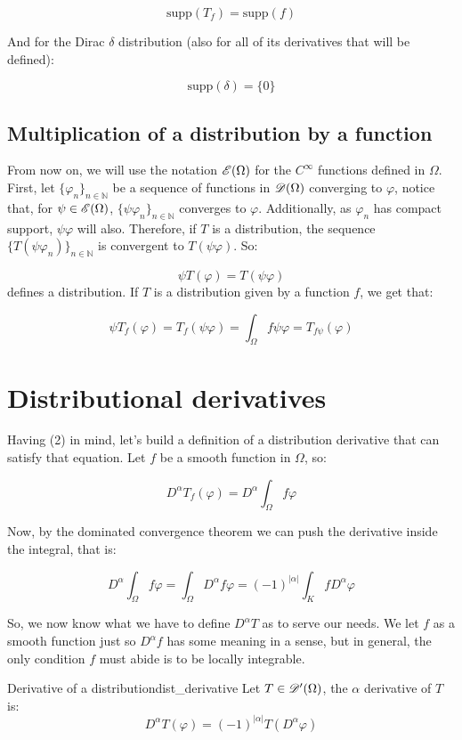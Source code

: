 \[\text{supp}(T_f)= \text{supp}(f)\]

And for the Dirac $\delta$ distribution (also for all of its derivatives that will be defined):

\[\text{supp}(\delta)= \{0\}\]

\subsection{Multiplication of a distribution by a function}

From now on, we will use the notation $\mathscr{E}(\Omega)$ for the $C^\infty$ functions defined in $\Omega$. First, let $\{\varphi_n\}_{n\in\mathbb{N}}$ be a sequence of functions in $\mathscr{D}(\Omega)$ converging to $\varphi$, notice that, for $\psi\in\mathscr{E}(\Omega)$, ${\{\psi\varphi_n\}_{n\in\mathbb{N}}}$ converges to $\varphi$. Additionally, as $\varphi_n$ has compact support, $\psi\varphi$ will also. Therefore, if $T$ is a distribution, the sequence ${\{T(\psi\varphi_n)\}_{n\in\mathbb{N}}}$ is convergent to $T(\psi\varphi)$. So:

\[\psi T(\varphi) = T(\psi\varphi)\]
defines a distribution.
If $T$ is a distribution given by a function $f$, we get that:

\[\psi T_f(\varphi) = T_f(\psi\varphi) = \int_{\Omega}f\psi\varphi = T_{f\psi}(\varphi)\]

\section{Distributional derivatives}

Having (2) in mind, let's build a definition of a distribution derivative that can satisfy that equation. Let $f$ be a smooth function in $\Omega$, so:

\[D^{\alpha}T_f(\varphi) = D^{\alpha}\int_{\Omega}f\varphi\]

Now, by the dominated convergence theorem we can push the derivative inside the integral, that is:

\[D^{\alpha}\int_{\Omega}f\varphi = \int_{\Omega}D^{\alpha}f\varphi = (-1)^{\left\lvert\alpha\right\rvert}\int_{K}fD^\alpha\varphi\]

So, we now know what we have to define $D^{\alpha}T$ as to serve our needs. We let $f$ as a smooth function just so $D^\alpha f$ has some meaning in a sense, but in general, the only condition $f$ must abide is to be locally integrable.

\begin{definition}{Derivative of a distribution}{dist_derivative}
    Let $T\in\mathscr{D}'(\Omega)$, the $\alpha$ derivative of $T$ is:
    \[D^\alpha T(\varphi) = (-1)^{\left\lvert\alpha \right\rvert}T(D^\alpha\varphi)\]
\end{definition}

